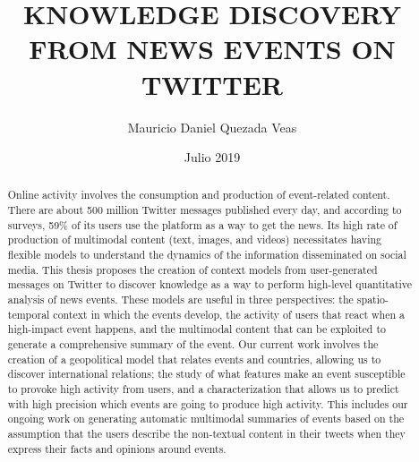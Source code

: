 \documentclass[upright, contnum]{umemoria}
\author{Mauricio Daniel Quezada Veas}
\title{KNOWLEDGE DISCOVERY FROM NEWS EVENTS ON TWITTER}
\date{Julio 2019}
\begin{document}
\frontmatter
\maketitle 

\begin{abstract} 

    Online activity involves the consumption and production of event-related
    content. 
    There are about 500 million Twitter messages published every day, and
    according to surveys, 59\% of its users use the platform as a way to get the
    news. 
    Its high rate of production of multimodal content (text, images, and videos)
    necessitates having flexible models to understand the dynamics of
    the information disseminated on social media. 
    This thesis proposes the creation of context models from user-generated
    messages on Twitter to discover knowledge as a way to perform high-level
    quantitative analysis of news events. 
    These models are useful in three perspectives: the
    spatio-temporal context in which the events develop, the activity of users
    that react when a high-impact event happens, and the multimodal content that
    can be exploited to generate a comprehensive summary of the event. 
    Our current work involves the creation of a geopolitical model that relates
    events and countries, allowing us to discover international relations; 
    the study of what features make an event susceptible to provoke high
    activity from users, and a characterization that allows us to predict with
    high precision which events are going to produce high activity. 
    This includes our ongoing work on generating automatic multimodal summaries
    of events based on the assumption that the users describe the non-textual
    content in their tweets when they express their facts and opinions around
    events.
\end{abstract}



\tableofcontents
\listoftables %
\listoffigures %

\mainmatter















\listoftodos[Notes]  %
\end{document}
